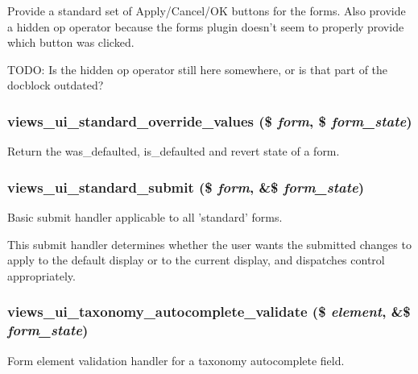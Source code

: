 \label{admin_8inc_a14c82c16cedbaecf8fb20e1aabc1a15b}
Provide a standard set of Apply/Cancel/OK buttons for the forms. Also provide a hidden op operator because the forms plugin doesn't seem to properly provide which button was clicked.

TODO: Is the hidden op operator still here somewhere, or is that part of the docblock outdated? \hypertarget{admin_8inc_a6fac05da3f398e15cb5a65095a755d42}{
\subsubsection[{views\_\-ui\_\-standard\_\-override\_\-values}]{\setlength{\rightskip}{0pt plus 5cm}views\_\-ui\_\-standard\_\-override\_\-values (\$ {\em form}, \/  \$ {\em form\_\-state})}}
\label{admin_8inc_a6fac05da3f398e15cb5a65095a755d42}
Return the was\_\-defaulted, is\_\-defaulted and revert state of a form. \hypertarget{admin_8inc_a9af5bfc6978dc754bdfe126ac758deda}{
\subsubsection[{views\_\-ui\_\-standard\_\-submit}]{\setlength{\rightskip}{0pt plus 5cm}views\_\-ui\_\-standard\_\-submit (\$ {\em form}, \/  \&\$ {\em form\_\-state})}}
\label{admin_8inc_a9af5bfc6978dc754bdfe126ac758deda}
Basic submit handler applicable to all 'standard' forms.

This submit handler determines whether the user wants the submitted changes to apply to the default display or to the current display, and dispatches control appropriately. \hypertarget{admin_8inc_ab2dd568a1f97cc0fbbc8bbe61ae2f906}{
\subsubsection[{views\_\-ui\_\-taxonomy\_\-autocomplete\_\-validate}]{\setlength{\rightskip}{0pt plus 5cm}views\_\-ui\_\-taxonomy\_\-autocomplete\_\-validate (\$ {\em element}, \/  \&\$ {\em form\_\-state})}}
\label{admin_8inc_ab2dd568a1f97cc0fbbc8bbe61ae2f906}
Form element validation handler for a taxonomy autocomplete field.

